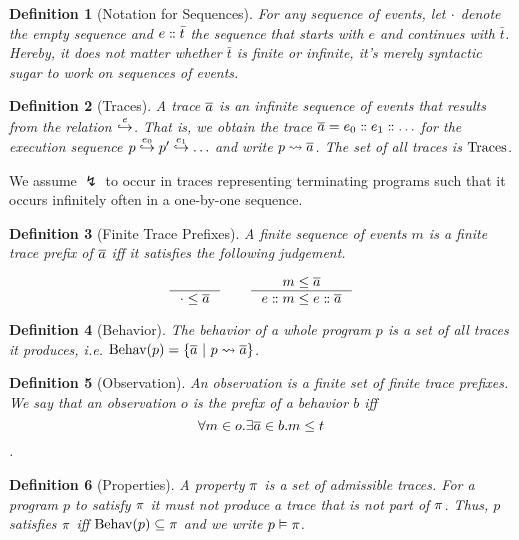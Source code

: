 \documentclass[a4paper,names,dvipsnames]{article}
\newtheorem{definition}{Definition}
\begin{document}
\begin{definition}[Notation for Sequences]
  For any sequence of events, let $\cdot$ denote the empty sequence and ${{e}:{\kern-6.25pt}:{\bar{t}}}$ the sequence that starts with $e$ and continues with $\bar{t}$.
  Hereby, it does not matter whether $\bar{t}$ is finite or infinite, it's merely syntactic sugar to work on sequences of events.
\end{definition}

\begin{definition}[Traces]
  A trace $\overline{a}$ is an infinite sequence of events that results from the relation $\stackrel{e}{\hookrightarrow}$.
  That is, we obtain the trace $\overline{a}={{e_{0}}:{\kern-6.25pt}:{{{e_{1}}:{\kern-6.25pt}:{\dots}}}}$ for the execution sequence ${p}\stackrel{e_{0}}{\hookrightarrow}{{p'}\stackrel{e_{1}}{\hookrightarrow}{\dots}}$ and write ${p}\leadsto{\overline{a}}$.
  The set of all traces is $\text{Traces}$.
\end{definition}
\noindent
We assume $\lightning$ to occur in traces representing terminating programs such that it occurs infinitely often in a one-by-one sequence.

\begin{definition}[Finite Trace Prefixes]
  A finite sequence of events $m$ is a finite trace prefix of $\overline{a}$ iff it satisfies the following judgement.

  $$
    \inference{}{\cdot\le\trace}\hspace{2em}\inference{m\le\trace}{\seqcons{e}{m}\le \seqcons{e}{\trace}}
  $$
\end{definition}

\begin{definition}[Behavior]
  The behavior of a whole program $p$ is a set of all traces it produces, i.e. $\behav{p}=\{\trace\ |\ \mktrace{p}{\trace}\}$.
\end{definition}

\begin{definition}[Observation]
  An observation is a finite set of finite trace prefixes.
  We say that an observation $o$ is the prefix of a behavior $b$ iff $$\forall m\in o.\exists \overline{a}\in b.m\le t$$.
\end{definition}

\begin{definition}[Properties]
  A property $\pi$ is a set of admissible traces. For a program $p$ to satisfy $\pi$ it must not produce a trace that is not part of $\pi$. Thus, $p$ satisfies $\pi$ iff $\text{Behav}({p})\subseteq\pi$ and we write ${p}\vDash{\pi}$.
\end{definition}
\end{document}
